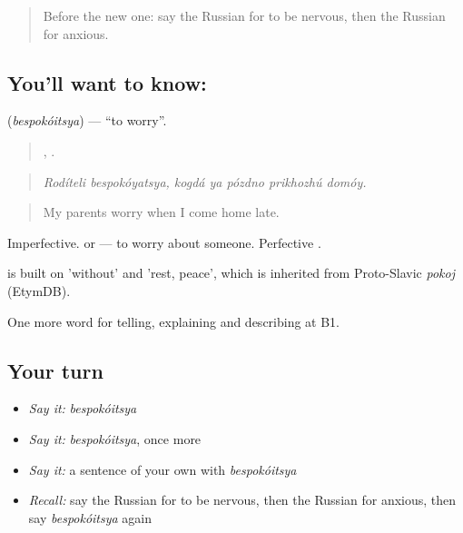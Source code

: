 \label{lesson:RU-C474-bespokoitsya}



\begin{quote}
Before the new one: say the Russian for to be nervous, then the Russian for anxious.
\end{quote}

\subsection*{You'll want to know: }
\textbf{} (\emph{bespokóitsya}) — \textquotedblleft{}to worry\textquotedblright{}.

\begin{quote}
 ,     .
\end{quote}

\begin{quote}
\emph{Rodíteli bespokóyatsya, kogdá ya pózdno prikhozhú domóy.}
\end{quote}

\begin{quote}
My parents worry when I come home late.
\end{quote}

Imperfective. \emph{  } or \emph{ } — to worry about someone. Perfective .

\begin{cousinweb}
\emph{} is built on \emph{} 'without' and \emph{} 'rest, peace', which is inherited from Proto-Slavic \emph{pokoj} (EtymDB).
\end{cousinweb}

\begin{grammarlens}[title={What you've built}]
One more word for telling, explaining and describing at B1.
\end{grammarlens}

\subsection*{Your turn}
\begin{itemize}
\raggedright
  \item \emph{Say it:} \emph{bespokóitsya}
  \item \emph{Say it:} \emph{bespokóitsya}, once more
  \item \emph{Say it:} a sentence of your own with \emph{bespokóitsya}
  \item \emph{Recall:} say the Russian for to be nervous, then the Russian for anxious, then say \emph{bespokóitsya} again
\end{itemize}

